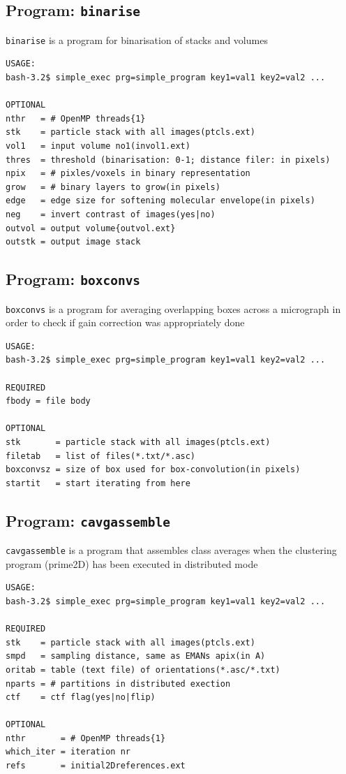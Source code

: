 \documentclass[a4paper,11pt]{article}
\newcommand{\prgname}[1]{\textcolor{NavyBlue}{\texttt{#1}}}
\begin{document}
\subsection{Program: \prgname{binarise}}
\label{binarise}
\prgname{binarise} is a program for binarisation of stacks and volumes

\begin{verbatim}
USAGE:
bash-3.2$ simple_exec prg=simple_program key1=val1 key2=val2 ...

OPTIONAL
nthr   = # OpenMP threads{1}
stk    = particle stack with all images(ptcls.ext)
vol1   = input volume no1(invol1.ext)
thres  = threshold (binarisation: 0-1; distance filer: in pixels)
npix   = # pixles/voxels in binary representation
grow   = # binary layers to grow(in pixels)
edge   = edge size for softening molecular envelope(in pixels)
neg    = invert contrast of images(yes|no)
outvol = output volume{outvol.ext}
outstk = output image stack
\end{verbatim}

\subsection{Program: \prgname{boxconvs}}
\label{boxconvs}
\prgname{boxconvs} is a program for averaging overlapping boxes across a micrograph in order to check if gain correction was appropriately done

\begin{verbatim}
USAGE:
bash-3.2$ simple_exec prg=simple_program key1=val1 key2=val2 ...

REQUIRED
fbody = file body

OPTIONAL
stk       = particle stack with all images(ptcls.ext)
filetab   = list of files(*.txt/*.asc)
boxconvsz = size of box used for box-convolution(in pixels)
startit   = start iterating from here
\end{verbatim}

\subsection{Program: \prgname{cavgassemble}}
\label{cavgassemble}
\prgname{cavgassemble} is a program that assembles class averages when the clustering program (prime2D) has been executed in distributed mode

\begin{verbatim}
USAGE:
bash-3.2$ simple_exec prg=simple_program key1=val1 key2=val2 ...

REQUIRED
stk    = particle stack with all images(ptcls.ext)
smpd   = sampling distance, same as EMANs apix(in A)
oritab = table (text file) of orientations(*.asc/*.txt)
nparts = # partitions in distributed exection
ctf    = ctf flag(yes|no|flip)

OPTIONAL
nthr       = # OpenMP threads{1}
which_iter = iteration nr
refs       = initial2Dreferences.ext
\end{verbatim}
\end{document}
